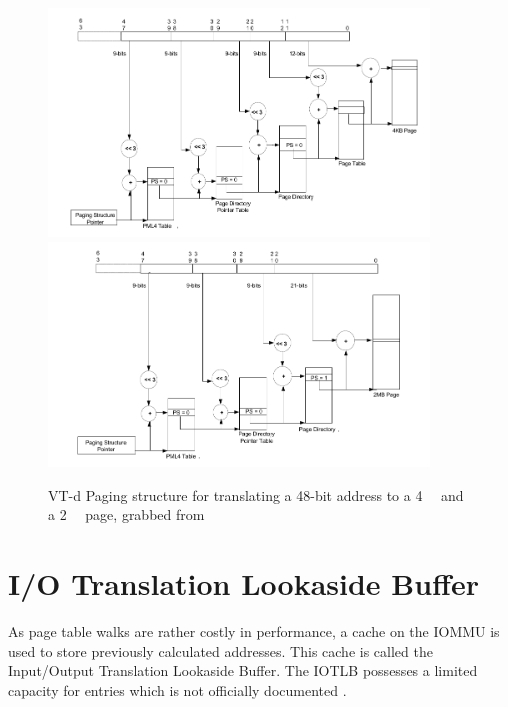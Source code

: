 
\begin{figure}
    \centering
     {\includegraphics[width=0.9\textwidth]{figures/4kibtranslation.pdf}\label{fig:pagewalk4kib}}
     {\includegraphics[width=0.9\textwidth]{figures/2mibtranslation.pdf}\label{fig:pagewalk2mib}}
    \caption{VT-d Paging structure for translating a 48-bit address to a \qty{4}{\kibi\byte} and a \qty{2}{\mebi\byte} page, grabbed from \cite{vtdspec}}
    \label{fig:pagewalk}
\end{figure}


\section{I/O Translation Lookaside Buffer}
As page table walks are rather costly in performance, a cache on the IOMMU is used to store previously calculated addresses. This cache is called the Input/Output Translation Lookaside Buffer. The IOTLB possesses a limited capacity for entries which is not officially documented \cite{iommuhuber}.

